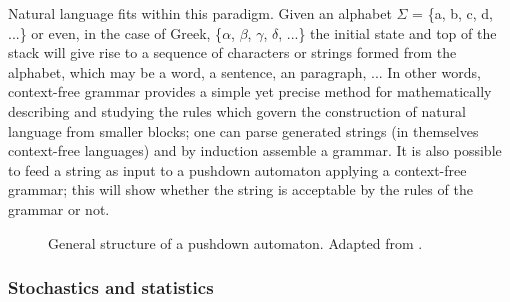 Natural language fits within this paradigm. Given an alphabet $\Sigma$ = \{a,
b, c, d, ...\} or even, in the case of Greek, \{$\alpha$, $\beta$, $\gamma$,
$\delta$, ...\} the initial state and top of the stack will give rise to a
sequence of characters or strings formed from the alphabet, which may be a
word, a sentence, an paragraph, ... In other words, context-free grammar
provides a simple yet precise method for mathematically describing and studying
the rules which govern the construction of natural language from smaller
blocks; one can parse generated strings (in themselves context-free languages)
and by induction assemble a grammar. It is also possible to feed a string as
input to a pushdown automaton applying a context-free grammar; this will show
whether the string is acceptable by the rules of the grammar or not.

\begin{figure}
  \begin{center}
\end{center}
\caption{General structure of a pushdown automaton. Adapted from \citet[220]{hopcroft2001}.} \label{fig:pushdownautomaton}
\end{figure}

\subsubsection{Stochastics and statistics} %
\label{ssub:stochastics}


